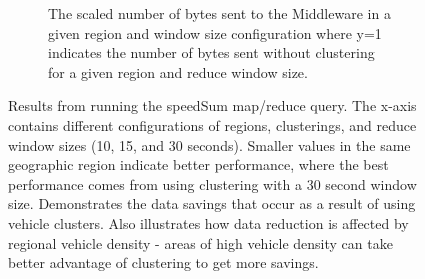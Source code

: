 \documentclass{thesis}
\begin{document}
\begin{figure}
\begin{subfigure}[h]{0.45\textwidth}
            \caption{The scaled number of bytes sent to the Middleware in a given region and window size
            configuration where y=1 indicates the number of bytes sent without clustering for a given region
            and reduce window size.}
        \end{subfigure}
        \caption{Results from running the speedSum map/reduce query. The x-axis contains different
            configurations of regions, clusterings, and reduce window sizes (10, 15, and 30 seconds). Smaller
            values in the same geographic region indicate better performance, where the best performance
            comes from using clustering with a 30 second window size. Demonstrates the data savings that occur as a result of using
            vehicle clusters. Also illustrates how data reduction is affected by regional vehicle
            density - areas of high vehicle density can take better advantage of clustering to get more savings.}
        \label{results:speedsum}
    \end{figure}
\end{document}
